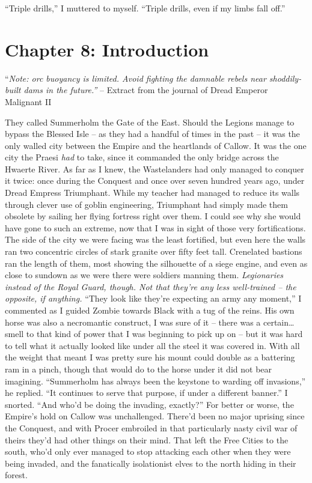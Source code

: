 \documentclass[12pt, openany]{book}
\begin{document}
“Triple drills,” I muttered to myself. “Triple drills, even if my limbs fall off.”
\clearpage
\chapter{Chapter 8: Introduction}

“\textit{Note: orc buoyancy is limited. Avoid fighting the damnable rebels near shoddily-built dams in the future.”}
– Extract from the journal of Dread Emperor Malignant II

They called Summerholm the Gate of the East.
Should the Legions manage to bypass the Blessed Isle – as they had a handful of times in the past – it was the only walled city between the Empire and the heartlands of Callow. It was the one city the Praesi \textit{had} to take, since it commanded the only bridge across the Hwaerte River. As far as I knew, the Wastelanders had only managed to conquer it twice: once during the Conquest and once over seven hundred years ago, under Dread Empress Triumphant. While my teacher had managed to reduce its walls through clever use of goblin engineering, Triumphant had simply made them obsolete by sailing her flying fortress right over them. I could see why she would have gone to such an extreme, now that I was in sight of those very fortifications. The side of the city we were facing was the least fortified, but even here the walls ran two concentric circles of stark granite over fifty feet tall. Crenelated bastions ran the length of them, most showing the silhouette of a siege engine, and even as close to sundown as we were there were soldiers manning them. \textit{Legionaries instead of the Royal Guard, though. Not that they’re any less well-trained – the opposite, if anything.}
“They look like they’re expecting an army any moment,” I commented as I guided Zombie towards Black with a tug of the reins.
His own horse was also a necromantic construct, I was sure of it – there was a certain… smell to that kind of power that I was beginning to pick up on – but it was hard to tell what it actually looked like under all the steel it was covered in. With all the weight that meant I was pretty sure his mount could double as a battering ram in a pinch, though that would do to the horse under it did not bear imagining.
“Summerholm has always been the keystone to warding off invasions,” he replied. “It continues to serve that purpose, if under a different banner.”
I snorted. “And who’d be doing the invading, exactly?”
For better or worse, the Empire’s hold on Callow was unchallenged. There’d been no major uprising since the Conquest, and with Procer embroiled in that particularly nasty civil war of theirs they’d had other things on their mind. That left the Free Cities to the south, who’d only ever managed to stop attacking each other when they were being invaded, and the fanatically isolationist elves to the north hiding in their forest.
\end{document}
